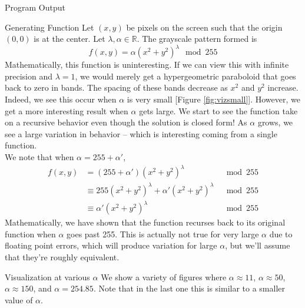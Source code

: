 \documentclass[11pt]{article}
\newcommand{\reffig}[1]{[Figure \ref{#1}]}
\begin{document}
\begin{section}{Program Output}
\begin{subsection}{Generating Function}
Let $(x, y)$ be pixels on the screen such that the origin $(0, 0)$ is at the center. Let $\lambda, \alpha \in \mathbb{R}$. The grayscale pattern formed is 
\[f(x, y) = \alpha (x^2 + y^2)^\lambda \mod 255 \]
Mathematically, this function is uninteresting. If we can view this with infinite precision and $\lambda = 1$, we would merely get a hypergeometric paraboloid that goes back to zero in bands. The spacing of these bands decrease as $x^2$ and $y^2$ increase. Indeed, we see this occur when $\alpha$ is very small \reffig{fig:vizsmall}. However, we get a more interesting result when $\alpha$ gets large. We start to see the function take on a recursive behavior even though the solution is closed form! As $\alpha$ grows, we see a large variation in behavior -- which is interesting coming from a single function.\\


We note that when $\alpha = 255 + \alpha'$,
\begin{align*}
f(x, y) &= (255 + \alpha') (x^2 + y^2)^\lambda &\mod 255 \\
&\equiv 255(x^2 + y^2)^\lambda + \alpha'(x^2+y^2)^\lambda & \mod 255\\
&\equiv \alpha' (x^2 + y^2)^\lambda & \mod 255
\end{align*}
Mathematically, we have shown that the function recurses back to its original function when $\alpha$ goes past 255. This is actually not true for very large $\alpha$ due to floating point errors, which will produce variation for large $\alpha$, but we'll assume that they're roughly equivalent.\\
\end{subsection}
\begin{subsection}{Visualization at various $\alpha$}
We show a variety of figures where $\alpha \approx 11$, $\alpha \approx 50$, $\alpha \approx 150$, and $\alpha = 254.85$. Note that in the last one this is similar to a smaller value of $\alpha$. \\


\end{subsection}
\end{section}
\end{document}
